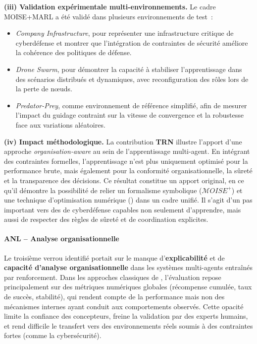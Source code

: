 \medskip
\noindent
\textbf{(iii) Validation expérimentale multi-environnements.}
Le cadre MOISE+MARL a été validé dans plusieurs environnements de test~:
\begin{itemize}
  \item \textit{Company Infrastructure}, pour représenter une infrastructure critique de cyberdéfense et montrer que l’intégration de contraintes de sécurité améliore la cohérence des politiques de défense.
  \item \textit{Drone Swarm}, pour démontrer la capacité à stabiliser l’apprentissage dans des scénarios distribués et dynamiques, avec reconfiguration des rôles lors de la perte de nœuds.
  \item \textit{Predator-Prey}, comme environnement de référence simplifié, afin de mesurer l’impact du guidage contraint sur la vitesse de convergence et la robustesse face aux variations aléatoires.
\end{itemize}

\medskip
\noindent
\textbf{(iv) Impact méthodologique.}
La contribution \textbf{TRN} illustre l’apport d’une approche \textit{organisation-aware} au sein de l’apprentissage multi-agent.
En intégrant des contraintes formelles, l’apprentissage n’est plus uniquement optimisé pour la performance brute, mais également pour la conformité organisationnelle, la sûreté et la transparence des décisions.
Ce résultat constitue un apport original, en ce qu’il démontre la possibilité de relier un formalisme symbolique ($\mathcal{M}OISE^+$) et une technique d’optimisation numérique () dans un cadre unifié.
Il s’agit d’un pas important vers des  de cyberdéfense capables non seulement d’apprendre, mais aussi de respecter des règles de sûreté et de coordination explicites.

\paragraph{ANL – Analyse organisationnelle}

Le troisième verrou identifié portait sur le manque d’\textbf{explicabilité} et de \textbf{capacité d’analyse organisationnelle} dans les systèmes multi-agents entraînés par renforcement.
Dans les approches classiques de , l’évaluation repose principalement sur des métriques numériques globales (récompense cumulée, taux de succès, stabilité), qui rendent compte de la performance mais non des mécanismes internes ayant conduit aux comportements observés.
Cette opacité limite la confiance des concepteurs, freine la validation par des experts humains, et rend difficile le transfert vers des environnements réels soumis à des contraintes fortes (comme la cybersécurité).

